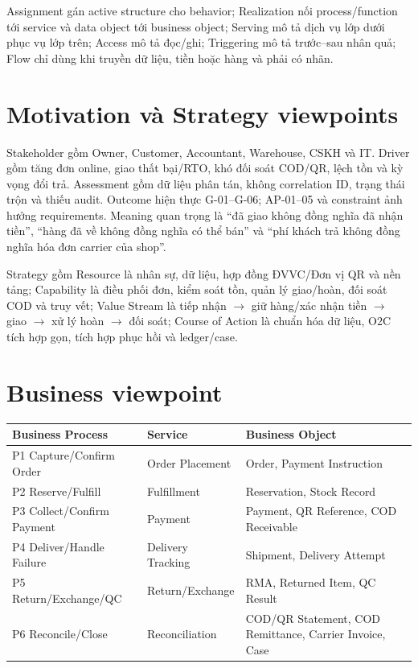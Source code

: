 \documentclass[12pt,a4paper]{report}
\begin{document}
Assignment gán active structure cho behavior; Realization nối process/function tới service và data object tới business object; Serving mô tả dịch vụ lớp dưới phục vụ lớp trên; Access mô tả đọc/ghi; Triggering mô tả trước--sau nhân quả; Flow chỉ dùng khi truyền dữ liệu, tiền hoặc hàng và phải có nhãn.

\section{Motivation và Strategy viewpoints}
Stakeholder gồm Owner, Customer, Accountant, Warehouse, CSKH và IT. Driver gồm tăng đơn online, giao thất bại/RTO, khó đối soát COD/QR, lệch tồn và kỳ vọng đổi trả. Assessment gồm dữ liệu phân tán, không correlation ID, trạng thái trộn và thiếu audit. Outcome hiện thực G-01--G-06; AP-01--05 và constraint ảnh hưởng requirements. Meaning quan trọng là ``đã giao không đồng nghĩa đã nhận tiền'', ``hàng đã về không đồng nghĩa có thể bán'' và ``phí khách trả không đồng nghĩa hóa đơn carrier của shop''.

Strategy gồm Resource là nhân sự, dữ liệu, hợp đồng ĐVVC/Đơn vị QR và nền tảng; Capability là điều phối đơn, kiểm soát tồn, quản lý giao/hoàn, đối soát COD và truy vết; Value Stream là tiếp nhận $\rightarrow$ giữ hàng/xác nhận tiền $\rightarrow$ giao $\rightarrow$ xử lý hoàn $\rightarrow$ đối soát; Course of Action là chuẩn hóa dữ liệu, O2C tích hợp gọn, tích hợp phục hồi và ledger/case.

\section{Business viewpoint}
\begin{longtable}{p{}p{}p{}}
\toprule
\textbf{Business Process} & \textbf{Service} & \textbf{Business Object}\\
\midrule\endhead
P1 Capture/Confirm Order & Order Placement & Order, Payment Instruction\\
P2 Reserve/Fulfill & Fulfillment & Reservation, Stock Record\\
P3 Collect/Confirm Payment & Payment & Payment, QR Reference, COD Receivable\\
P4 Deliver/Handle Failure & Delivery Tracking & Shipment, Delivery Attempt\\
P5 Return/Exchange/QC & Return/Exchange & RMA, Returned Item, QC Result\\
P6 Reconcile/Close & Reconciliation & COD/QR Statement, COD Remittance, Carrier Invoice, Case\\
\bottomrule
\end{longtable}
\end{document}
